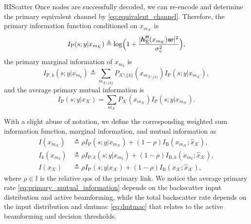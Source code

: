 \documentclass[journal,12pt,onecolumn,draftclsnofoot]{IEEEtran}
\theoremstyle{remark}
\begin{document}
\begin{section}{RIScatter}
	Once nodes are successfully decoded, we can re-encode and determine the primary equivalent channel by \eqref{eq:equivalent_channel}.
	Therefore, the primary information function conditioned on $x_{m_{\mathcal{K}}}$ is
	\begin{equation}
		I_{\text{P}}(s;y|x_{m_{\mathcal{K}}}) \triangleq \log \Bigl(1 + \frac{\lvert \boldsymbol{h}_{\text{E}}^\mathsf{H}(x_{m_{\mathcal{K}}}) \boldsymbol{w} \rvert^2}{\sigma_v^2}\Bigr),
		\label{eq:primary_information_function}
	\end{equation}
	the primary marginal information of $x_{m_k}$ is
	\begin{equation}
		I_{\text{P},k}(s;y|x_{m_k}) \triangleq \sum_{m_{\mathcal{K} \setminus \{k\}}} P_{\mathcal{K} \setminus \{k\}}(x_{m_{\mathcal{K} \setminus \{k\}}}) I_{\text{P}}(s;y|x_{m_{\mathcal{K}}}),
		\label{eq:primary_marginal_information}
	\end{equation}
	and the average primary mutual information is
	\begin{equation}
		I_{\text{P}}(s;y|x_{\mathcal{K}}) = \sum_{m_{\mathcal{K}}} P_{\mathcal{K}}(x_{m_{\mathcal{K}}}) I_{\text{P}}(s;y|x_{m_{\mathcal{K}}}).
		\label{eq:primary_mutual_information}
	\end{equation}

	With a slight abuse of notation, we define the corresponding weighted sum information function, marginal information, and mutual information as
	\begin{align}
		I(x_{m_{\mathcal{K}}})
		 & \triangleq \rho I_{\text{P}}(s;y|x_{m_{\mathcal{K}}}) + (1 - \rho) I_{\text{B}}(x_{m_{\mathcal{K}}};\hat{x}_{\mathcal{K}}),\label{eq:weighted_sum_information_function} \\
		I_k(x_{m_k})
		 & \triangleq \rho I_{\text{P},k}(s;y|x_{m_k}) + (1 - \rho) I_{\text{B},k}(x_{m_k};\hat{x}_{\mathcal{K}}),\label{eq:weighted_sum_marginal_information}                     \\
		I(x_{\mathcal{K}})
		 & \triangleq \rho I_{\text{P}}(s;y|x_{\mathcal{K}}) + (1 - \rho) I_{\text{B}}(x_{\mathcal{K}};\hat{x}_{\mathcal{K}}),\label{eq:weighted_sum_mutual_information}
	\end{align}
	where $\rho \in \mathbb{I}$ is the relative \gls{qos} of the primary link.
	We notice the average primary rate \eqref{eq:primary_mutual_information} depends on the backscatter input distribution and active beamforming, while the total backscatter rate depends on the input distribution and \gls{dmtmac} \eqref{eq:dmtmac} that relates to the active beamforming and decision thresholds.
	\label{st:information_theory}
	\label{st:riscatter}
\end{section}
\end{document}
